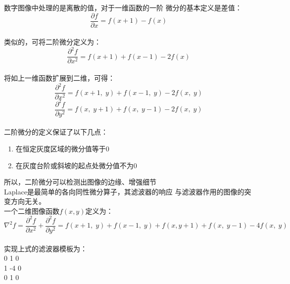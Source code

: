 
数字图像中处理的是离散的值，对于一维函数的一阶
微分的基本定义是差值：\\ 
\[\frac{\partial f}{\partial x}=f\left(x+1\right)-f\left(x\right)\]
\\类似的，可将二阶微分定义为：\\
\[\frac{\partial^2f}{\partial x^2}=f\left(x+1\right)+f\left(x-1\right)-2f(x)\]
\\将如上一维函数扩展到二维，可得：\\
\[\frac{\partial^2f}{\partial x^2}=f\left(x+1,\;y\right)+f\left(x-1,\;y\right)-2f(x,\;y)\]
\[\frac{\partial^2f}{\partial y^2}=f\left(x,\;y+1\right)+f\left(x,\;y-1\right)-2f(x,\;y)\]
\\二阶微分的定义保证了以下几点：
\begin{enumerate}
    \item 在恒定灰度区域的微分值等于0
    \item 在灰度台阶或斜坡的起点处微分值不为0
\end{enumerate}
所以，二阶微分可以检测出图像的边缘、增强细节\\
Laplace是最简单的各向同性微分算子，其滤波器的响应
与滤波器作用的图像的突变方向无关。\\
一个二维图像函数$f(x, y)$定义为：\\
\[\nabla^2f=\frac{\partial^2f}{\partial x^2}+\frac{\partial^2f}{\partial y^2}=f\left(x+1,\;y\right)+f\left(x-1,\;y\right)+f(x,y+1)+f(x,\;y-1)-4f(x,\;y)\]
\\实现上式的滤波器模板为：\\
0   1   0\\
1  -4   0\\
0   1   0\\
   